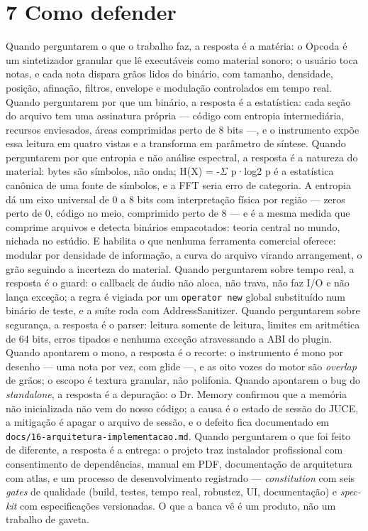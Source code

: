 \documentclass[11pt,a4paper]{article}
\newcommand{\code}[1]{\texttt{\small #1}}
\begin{document}
\section*{7 Como defender}
Quando perguntarem o que o trabalho faz, a resposta é a matéria: o Opcoda é um sintetizador granular que lê executáveis como material sonoro; o usuário toca notas, e cada nota dispara grãos lidos do binário, com tamanho, densidade, posição, afinação, filtros, envelope e modulação controlados em tempo real. Quando perguntarem por que um binário, a resposta é a estatística: cada seção do arquivo tem uma assinatura própria --- código com entropia intermediária, recursos enviesados, áreas comprimidas perto de 8 bits ---, e o instrumento expõe essa leitura em quatro vistas e a transforma em parâmetro de síntese. Quando perguntarem por que entropia e não análise espectral, a resposta é a natureza do material: bytes são símbolos, não onda; H(X) = -\(\Sigma\) p·log2 p é a estatística canônica de uma fonte de símbolos, e a FFT seria erro de categoria. A entropia dá um eixo universal de 0 a 8 bits com interpretação física por região --- zeros perto de 0, código no meio, comprimido perto de 8 --- e é a mesma medida que comprime arquivos e detecta binários empacotados: teoria central no mundo, nichada no estúdio. E habilita o que nenhuma ferramenta comercial oferece: modular por densidade de informação, a curva do arquivo virando arrangement, o grão seguindo a incerteza do material. Quando perguntarem sobre tempo real, a resposta é o guard: o callback de áudio não aloca, não trava, não faz I/O e não lança exceção; a regra é vigiada por um \code{operator new} global substituído num binário de teste, e a suíte roda com AddressSanitizer. Quando perguntarem sobre segurança, a resposta é o parser: leitura somente de leitura, limites em aritmética de 64 bits, erros tipados e nenhuma exceção atravessando a ABI do plugin. Quando apontarem o mono, a resposta é o recorte: o instrumento é mono por desenho --- uma nota por vez, com glide ---, e as oito vozes do motor são \emph{overlap} de grãos; o escopo é textura granular, não polifonia. Quando apontarem o bug do \emph{standalone}, a resposta é a depuração: o Dr. Memory confirmou que a memória não inicializada não vem do nosso código; a causa é o estado de sessão do JUCE, a mitigação é apagar o arquivo de sessão, e o defeito fica documentado em \code{docs/16-arquitetura-implementacao.md}. Quando perguntarem o que foi feito de diferente, a resposta é a entrega: o projeto traz instalador profissional com consentimento de dependências, manual em PDF, documentação de arquitetura com atlas, e um processo de desenvolvimento registrado --- \emph{constitution} com seis \emph{gates} de qualidade (build, testes, tempo real, robustez, UI, documentação) e \emph{spec-kit} com especificações versionadas. O que a banca vê é um produto, não um trabalho de gaveta.

\vfill
{}
\end{document}
